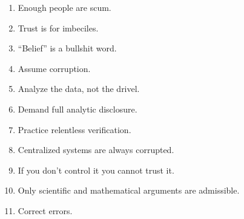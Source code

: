 \begin{enumerate}
\def\labelenumi{\arabic{enumi}.}
\item
  Enough people are scum.
\item
  Trust is for imbeciles.
\item
  ``Belief'' is a bullshit word.
\item
  Assume corruption.
\item
  Analyze the data, not the drivel.
\item
  Demand full analytic disclosure.
\item
  Practice relentless verification.
\item
  Centralized systems are always corrupted.
\item
  If you don't control it you cannot trust it.
\item
  Only scientific and mathematical arguments are admissible.
\item
  Correct errors.
\end{enumerate}


%



%
 